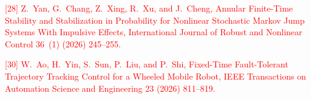 \documentclass[10pt,fleqn]{article}
\begin{document}
{ \textcolor{red}{[28] Z.~Yan, G.~Chang, Z.~Xing, R.~Xu, and J.~Cheng, Annular {{Finite-Time Stability}} and {{Stabilization}} in {{Probability}} for {{Nonlinear Stochastic Markov Jump Systems With Impulsive Effects}}, International Journal of Robust and Nonlinear Control 36~(1) (2026) 245--255.}\par}
{ \textcolor{red}{[30] W.~Ao, H.~Yin, S.~Sun, P.~Liu, and P.~Shi, Fixed-{{Time Fault-Tolerant Trajectory Tracking Control}} for a {{Wheeled Mobile Robot}}, IEEE Transactions on Automation Science and Engineering 23 (2026) 811--819.}\par}
\endgroup
%
%
%
\end{document}
